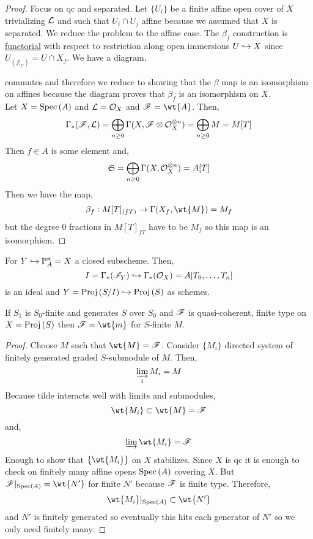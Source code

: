 \documentclass[12pt]{article}
\begin{document}
\begin{proof}
Focus on qc and separated. Let $\{ U_i \}$ be a finite affine open cover of $X$ trivializing $\mathcal{L}$ and such that $U_i \cap U_j$ affine because we assumed that $X$ is separated. We reduce the problem to the affine case. The $\beta_f$ construction is \underline{functorial} with respect to restriction along open immersions $U \hookrightarrow X$ since $U_{(f|_U)} = U \cap X_f$. We have a diagram,
\begin{center}
\end{center}
commutes and therefore we reduce to showing that the $\beta$ map is an isomorphism on affines because the diagram proves that $\beta_f$ is an isomorphism on $X$. 
\bigskip\\
Let $X = \mathrm{Spec}\left( A \right)$ and $\mathcal{L} = \mathcal{O}_{X}$ and $\F = \wt{A}$. Then,
\[ \Gamma_*(\mathscr{F}, \mathcal{L}) = \bigoplus_{n \ge 0} \Gamma(X, \mathscr{F} \otimes \mathcal{O}_{X}^{\otimes n}) = \bigoplus_{n \ge 0} M = M[T] \]
Then $f \in A$ is some element and,
\[ \mathfrak{S} = \bigoplus_{n \ge 0} \Gamma(X, \mathcal{O}_{X}^{\otimes n}) = A[T] \]
Then we have the map,
\[ \beta_f : M[T]_{(fT)} \to \Gamma(X_f, \wt{M}) = M_f \]
but the degree $0$ fractions in $M[T]_{fT}$ have to be $M_f$ so this map is an isomorphism.
\end{proof}

\begin{cor}
For $Y \hookrightarrow \mathbb{P}^n_A = X$ a closed subscheme. Then,
\[ I = \Gamma_*(\mathscr{I}_Y) \hookrightarrow \Gamma_*(\mathcal{O}_{X}) = A[T_0, \dots, T_n] \]
is an ideal and $Y = \mathrm{Proj}\left( S/I \right) \hookrightarrow \mathrm{Proj}\left( S \right)$ as schemes.
\end{cor}

\begin{cor}
If $S_1$ is $S_0$-finite and generates $S$ over $S_0$ and $\mathscr{F}$ is quasi-coherent, finite type on $X = \mathrm{Proj}\left( S \right)$ then $\F = \wt{m}$ for $S$-finite $M$. 
\end{cor}

\begin{proof}
Choose $M$ such that $\wt{M} = \F$. Consider $\{ M_i \}$ directed system of finitely generated graded $S$-submodule of $M$. Then,
\[ \varinjlim_{i} M_i = M \]
Because tilde interacts well with limits and submodules,
\[ \wt{M_i} \subset \wt{M} = \F \]
and,
\[ \varinjlim \wt{M_i} = \F \]
Enough to show that $\{ \wt{M_i} \}$ on $X$ stabilizes. Since $X$ is qc it is enough to check on finitely many affine opens $\mathrm{Spec}\left( A \right)$ covering $X$. But $\F|_{\Spec{A}} = \wt{N'}$ for finite $N'$ because $\mathscr{F}$ is finite type. Therefore,
\[ \wt{M_i} |_{\Spec{A}} \subset \wt{N'} \]
and $N'$ is finitely generated so eventually this hits each generator of $N'$ so we only need finitely many. 
\end{proof}
\end{document}
